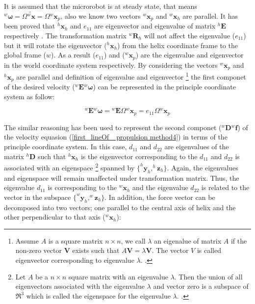 \documentclass[12pt,a4paper,titlepage]{report}
\begin{document}
It is assumed that the microrobot is at steady state, that means $^{w}\bm{\omega} = 
\Omega \tilde{^{w}{\bm{x}}} = \Omega {^{w}{\bm{x}_p}}$, also we know two vectors ${^{w}{\bm{x}_p}}$ and
 ${^{w}{\bm{x}_h}}$ are parallel. It has been proved that $^{h}\bm{x}_h$ and $e_{11}$ are eigenvector and eigenvalue
of matrix $^{h}\bm{E}$ respectively \citep{mahoney2011velocity}. The transformation matrix $^{w}\bm{R}_h$ 
will not affect the eigenvalue ($e_{11}$) but it will rotate the eigenvector ($^{h}\bm{x}_h$) from the helix coordinate
frame to the global frame ($w$). As a result ($e_{11}$) and ($^{w}\bm{x}_p$) are the eigenvalue and eigenvector
in the world coordinate system respectively. By considering the vectors $^{w}\bm{x}_p$ and $^{h}\bm{x}_p$ are parallel 
and definition of eigenvalue and eigenvector \footnote{Assume $A $ is a square matrix $n \times n$, we call
$\lambda$ an eigenalue of matrix $A$ if the non-zero vector $\bm{V}$ exists such that $A\bm{V} = \lambda \bm{V}$.
The vector $V$ is called eigenvector corresponding to eigenvalue $\lambda$.
 \citep{Doe:2013Nov:Online}.}
the first componet of the desired velocity (${^{w}\bm{E}} {^{w}\bm{\omega}}$) can be 
represented in the principle
coordinate system as follow:


\begin{equation}
{^{w}\bm{E}} {^{w}\bm{\omega}} = {^{w}\bm{E}} \Omega {^{w}{\bm{x}_p}} = e_{11} \Omega {^{w}{\bm{x}_p}}
\label{E_W}
\end{equation}

The similar reasoning has been used to represent the second componet (${^{w}\bm{D}} {^{w}\bm{f}}$) of 
the velocity equasion (\ref{first_lineOf_ propulsion method4}) in terms of the
principle coordinate system. In this case, $d_{11}$ and $d_{22}$ are eigenvalues of the matrix $^{h}\bm{D}$ 
such that $^{h}\bm{x}_h$ is the eigenvector corresponding to the $d_{11}$ and $d_{22}$ is associated with
an eigenspace \footnote{Let $A $ be a $n \times n$ square matrix with an 
eigenvalue $\lambda$. Then the union of all eigenvectors associated with the eigenvalue $\lambda $ and
vector zero is a subspace of $\Re ^{3}$ which is called the eigenspace for the eigenvalue $\lambda$.
\citep{Doe:2014Aug:Online}.} spanned by $\{ ^{h}\bm{y}_{h} , ^{h}\bm{z}_{h} \}$. Again, the eigenvalues and
eigenspace will remain unaffected under transformation matrix. Thus, the eigenvalue $d_{11}$ is corresponding 
to the $^{w}\bm{x}_h$ and the eigenvalue $d_{22}$ is related to the vector in the 
subspace $\{ ^{w}\bm{y}_h ,   ^{w}\bm{z}_h  \}$. In addition, the force vector can be decomposed into two  
vectors; one parallel to the central axis of helix and the other perpendicular to that axis ($^{w}\bm{x}_h$):
\end{document}
